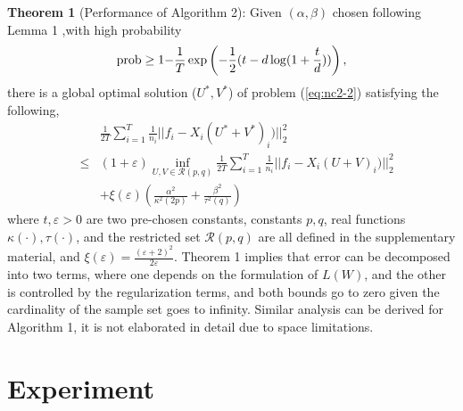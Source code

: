 \documentclass{article}
\newcounter{thm_counter}
\newcounter{lem_counter}
\newcounter{pro_counter}
\begin{document}
\noindent \textbf{Theorem 1} (Performance of Algorithm 2): Given $(\alpha, \beta)$ chosen following Lemma 1 ,with high probability
\begin{equation}
{\rm {prob}}\ge{\rm {1-}}\frac{1}{T}\exp\left({-\frac{1}{2}(t-d\log(1+\frac{t}{d}))}\right),
\end{equation}
there is a global optimal solution ($U^*, V^*$) of problem (\ref{eq:nc2-2}) satisfying the following,
\begin{eqnarray}
&&  \frac{1}{{2T}}\sum\limits_{i = 1}^T {\frac{1}{{{n_i}}}||{f_i} - {X_i}{{(U^* + V^*)}_i})||_2^2} \\
\nonumber
&\le& (1 + \varepsilon )\mathop {\inf }\limits_{U,V \in \mathcal{R}( p,q) }  \frac{1}{{2T}}\sum\limits_{i = 1}^T {\frac{1}{{{n_i}}}||{f_i} - {X_i}{{(U + V)}_i})||_2^2} \\
\nonumber
&& { + \xi (\varepsilon )\left( {\frac{{{\alpha ^2}}}{{{\kappa^2}(2p)}} + \frac{{{\beta ^2}}}{{{\tau^2}(q)}}} \right)}
\end{eqnarray}
%
where $t, \varepsilon >0$ are two pre-chosen constants,  constants $p,q$, real functions $\kappa(\cdot), \tau(\cdot)$,  and the restricted set $\mathcal{R}( p,q)$ are all defined in the supplementary material, and $\xi (\varepsilon ) = \frac{{{{(\varepsilon  + 2)}^2}}}{{2\varepsilon }}$. Theorem 1 implies that  error can be decomposed into two terms, where one depends on the formulation of $L(W)$, and the other is controlled by the regularization terms, and both bounds go to zero given the cardinality of the sample set goes to infinity.
Similar analysis can be derived for Algorithm 1, it is not elaborated in detail due to space limitations.


\section{Experiment}
\end{document}
